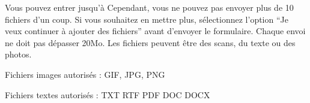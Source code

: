 ﻿Vous pouvez entrer jusqu’à %
Cependant, vous ne pouvez pas envoyer plus de 10 fichiers d’un coup. Si vous souhaitez en mettre plus, sélectionnez l’option “Je veux continuer à ajouter des fichiers” avant d’envoyer le formulaire.
Chaque envoi ne doit pas dépasser 20Mo.
Les fichiers peuvent être des scans, du texte ou des photos.
\item Fichiers images autorisés : GIF, JPG, PNG
\item Fichiers textes autorisés : TXT RTF PDF DOC DOCX